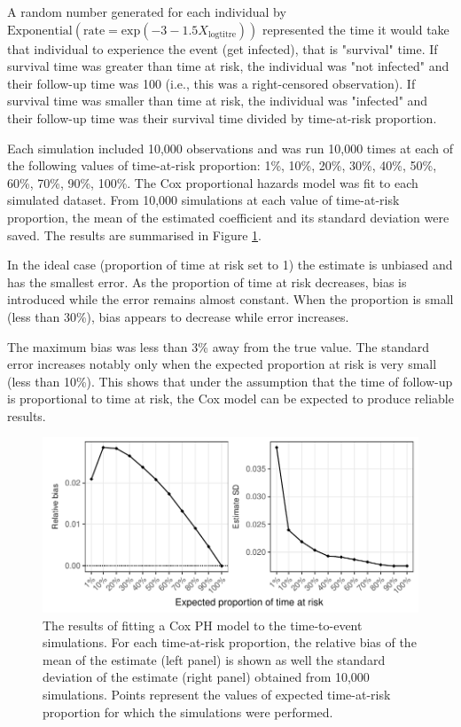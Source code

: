 A random number generated for each individual by $\text{Exponential}(\text{rate} = \text{exp}(-3 - 1.5 X_{\text{logtitre}}) )$ represented the time it would take that individual to experience the event (get infected), that is "survival" time. If survival time was greater than time at risk, the individual was "not infected" and their follow-up time was 100 (i.e., this was a right-censored observation). If survival time was smaller than time at risk, the individual was "infected" and their follow-up time was their survival time divided by time-at-risk proportion.

Each simulation included 10,000 observations and was run 10,000 times at each of the following values of time-at-risk proportion: 1\%, 10\%, 20\%, 30\%, 40\%, 50\%, 60\%, 70\%, 90\%, 100\%. The Cox proportional hazards model was fit to each simulated dataset. From 10,000 simulations at each value of time-at-risk proportion, the mean of the estimated coefficient and its standard deviation were saved. The results are summarised in Figure \ref{CoxSimResults}.

In the ideal case (proportion of time at risk set to 1) the estimate is unbiased and has the smallest error. As the proportion of time at risk decreases, bias is introduced while the error remains almost constant. When the proportion is small (less than 30\%), bias appears to decrease while error increases.

The maximum bias was less than 3\% away from the true value. The standard error increases notably only when the expected proportion at risk is very small (less than 10\%). This shows that under the assumption that the time of follow-up is proportional to time at risk, the Cox model can be expected to produce reliable results.

\begin{figure}[htp]
	\centering
	\includegraphics[width=1\textwidth]{../cox-tarprop-plot/risk.pdf}
	\caption{
	The results of fitting a Cox PH model to the time-to-event simulations. For each time-at-risk proportion, the relative bias of the mean of the estimate (left panel) is shown as well the standard deviation of the estimate (right panel) obtained from 10,000 simulations. Points represent the values of expected time-at-risk proportion for which the simulations were performed.
	}
	\label{CoxSimResults}
\end{figure}

